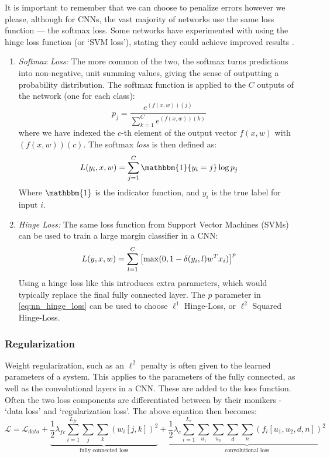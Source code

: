   It is important to remember that we can choose
  to penalize errors however we please, although for CNNs, the vast majority of
  networks use the same loss function --- the softmax loss. Some networks have
  experimented with using the hinge loss function (or `SVM loss'), stating they
  could achieve improved results \citep{gu_recent_2015,tang_deep_2013}. 
  \begin{enumerate}

  \item \emph{Softmax Loss:} The more common of the two, the softmax turns
    predictions into non-negative, unit summing values, giving the sense of
    outputting a probability distribution. The softmax function is applied to
    the $C$ outputs of the network (one for each class):
    \begin{equation}
      p_j = \frac{e^{(f(x, w))(j)}}{\sum\limits_{k=1}^{C}e^{(f(x,w))(k)}}
    \end{equation}
    where we have indexed the $c$-th element of the output vector $f(x,w)$ with
      $(f(x,w))(c)$. The softmax \emph{loss} is then defined as:
    \begin{equation}
      \loss (y_i, x, w)
      = \sum_{j=1}^{C} \mathbbm{1}\{y_i=j\} \log p_j
    \end{equation}
    Where $\mathbbm{1}$ is the indicator function, and $y_i$ is the true label
    for input $i$.

  \item \emph{Hinge Loss:} The same loss function from Support Vector
    Machines (SVMs) can be used to train a large margin classifier in a CNN:
    \begin{equation}
      L(y,x,w) = \sum_{l=1}^{C} 
        {\left[ \max(0, 1 - \delta(y_i,l) w^{T}x_{i}) \right]}^p \label{eq:nn_hinge_loss}
    \end{equation}
    Using a hinge loss like this introduces extra parameters, which would
    typically replace the final fully connected layer. The $p$ parameter in
    \autoref{eq:nn_hinge_loss} can be used to choose $\ell^1$ Hinge-Loss, or
    $\ell^2$ Squared Hinge-Loss. 

  \end{enumerate}
  

\subsubsection{Regularization}
  Weight regularization, such as an $\ell^2$ penalty is often given to the
  learned parameters of a system. This applies to the parameters of the fully
  connected, as well as the convolutional layers in a CNN\@. These are added to
  the loss function. Often the two loss components are differentiated between by
  their monikers - `data loss' and `regularization loss'. The above 
  equation then becomes:
  \begin{equation}
    \mathcal{L} = \mathcal{L}_{data} + \underbrace{\frac{1}{2}\lambda_{fc}
    \sum_{i=1}^{L_{fc}} \sum_{j} \sum_{k} {(w_{i}[j,k])}^2}_{\text{fully connected
    loss}} +
    \underbrace{\frac{1}{2}\lambda_{c} \sum_{i=1}^{L_c} \sum_{u_1} \sum_{u_2} \sum_{d}
    \sum_{n} \left(f_i[u_1,u_2,d,n]\right)^2}_{\text{convolutional loss}}
  \end{equation}

